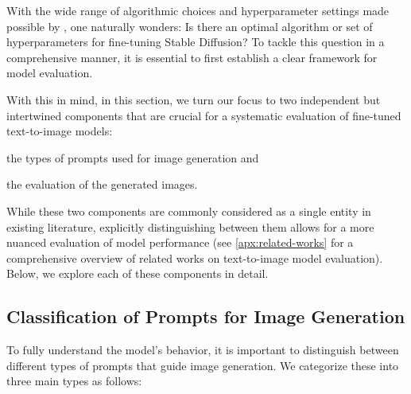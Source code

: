 With the wide range of algorithmic choices and hyperparameter settings made possible by \lycoris, one naturally wonders: Is there an optimal algorithm or set of hyperparameters for fine-tuning Stable Diffusion? To tackle this question in a comprehensive manner, it is essential to first establish a clear framework for model evaluation.

With this in mind, in this section, we turn our focus to two independent but intertwined components that are crucial for a systematic evaluation of fine-tuned text-to-image models:
\begin{enumerate*}
    \item the types of prompts used for image generation and
    \item the evaluation of the generated images. 
\end{enumerate*}
While these two components are commonly considered as a single entity in existing literature, explicitly distinguishing between them allows for a more nuanced evaluation of model performance (see \cref{apx:related-works}
for a comprehensive overview of related works on text-to-image model evaluation). Below, we explore each of these components in detail.


\subsection{Classification of Prompts for Image Generation}
\label{subsec:prompt-classif}

To fully understand the model's behavior, it is important to distinguish between different types of prompts that guide image generation. We categorize these into three main types as follows:

